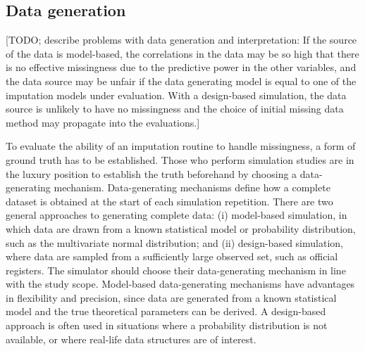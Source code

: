 \documentclass[bimj,fleqn]{w-art}
\begin{document}

\subsection{Data generation}


[TODO; describe problems with data generation and interpretation: If the source of the data is model-based, the correlations in the data may be so high that there is no effective missingness due to the predictive power in the other variables, and the data source may be unfair if the data generating model is equal to one of the imputation models under evaluation. With a design-based simulation, the data source is unlikely to have no missingness and the choice of initial missing data method may propagate into the evaluations.]

To evaluate the ability of an imputation routine to handle missingness, a form of ground  truth has to be established. Those who perform simulation studies are in the luxury position to establish the truth beforehand by choosing a data-generating mechanism. Data-generating mechanisms define how a complete dataset is obtained at the start of each simulation repetition. There are two general approaches to generating complete data: (i) model-based simulation, in which data are drawn from a known statistical model or probability distribution, such as the multivariate normal distribution; and (ii) design-based simulation, where data are sampled from a sufficiently large observed set, such as official registers. The simulator should choose their data-generating mechanism in line with the study scope. Model-based data-generating mechanisms have advantages in flexibility and precision, since data are generated from a known statistical model and the true theoretical parameters can be derived. A design-based approach is often used in situations where a probability distribution is not available, or where real-life data structures are of interest.
\end{document}
